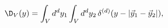 \begin{equation}
\label{hol5}
    \D_V(y)=\int_V d^dy_1\int_V d^dy_2 \,
            \delta^{(d)}(y-|\vec{y}_1-\vec{y}_2|),
\end{equation}

